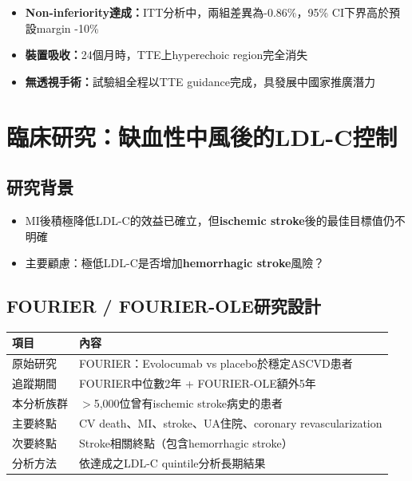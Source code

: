 \documentclass[12pt,a4paper]{article}
\begin{document}
\begin{itemize}
    \item \textbf{Non-inferiority達成：}ITT分析中，兩組差異為-0.86\%，95\% CI下界高於預設margin -10\%
    \item \textbf{裝置吸收：}24個月時，TTE上hyperechoic region完全消失
    \item \textbf{無透視手術：}試驗組全程以TTE guidance完成，具發展中國家推廣潛力
\end{itemize}


\section{臨床研究：缺血性中風後的LDL-C控制}

\subsection{研究背景}

\begin{itemize}
    \item MI後積極降低LDL-C的效益已確立，但\textbf{ischemic stroke}後的最佳目標值仍不明確
    \item 主要顧慮：極低LDL-C是否增加\textbf{hemorrhagic stroke}風險？
\end{itemize}

\subsection{FOURIER / FOURIER-OLE研究設計}

\begin{longtable}{p{4cm}p{10cm}}
\toprule
\textbf{項目} & \textbf{內容} \\
\midrule
\endfirsthead
\bottomrule
\endfoot

原始研究 & FOURIER：Evolocumab vs placebo於穩定ASCVD患者 \\
\midrule
追蹤期間 & FOURIER中位數2年 + FOURIER-OLE額外5年 \\
\midrule
本分析族群 & $>$5,000位曾有ischemic stroke病史的患者 \\
\midrule
主要終點 & CV death、MI、stroke、UA住院、coronary revascularization \\
\midrule
次要終點 & Stroke相關終點（包含hemorrhagic stroke） \\
\midrule
分析方法 & 依達成之LDL-C quintile分析長期結果 \\
\bottomrule
\end{longtable}
\end{document}
